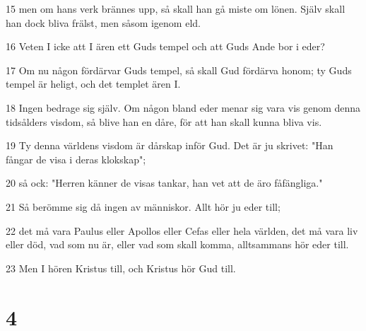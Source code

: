 \par 15 men om hans verk brännes upp, så skall han gå miste om lönen. Själv skall han dock bliva frälst, men såsom igenom eld.
\par 16 Veten I icke att I ären ett Guds tempel och att Guds Ande bor i eder?
\par 17 Om nu någon fördärvar Guds tempel, så skall Gud fördärva honom; ty Guds tempel är heligt, och det templet ären I.
\par 18 Ingen bedrage sig själv. Om någon bland eder menar sig vara vis genom denna tidsålders visdom, så blive han en dåre, för att han skall kunna bliva vis.
\par 19 Ty denna världens visdom är dårskap inför Gud. Det är ju skrivet: "Han fångar de visa i deras klokskap";
\par 20 så ock: "Herren känner de visas tankar, han vet att de äro fåfängliga."
\par 21 Så berömme sig då ingen av människor. Allt hör ju eder till;
\par 22 det må vara Paulus eller Apollos eller Cefas eller hela världen, det må vara liv eller död, vad som nu är, eller vad som skall komma, alltsammans hör eder till.
\par 23 Men I hören Kristus till, och Kristus hör Gud till.

\chapter{4}

